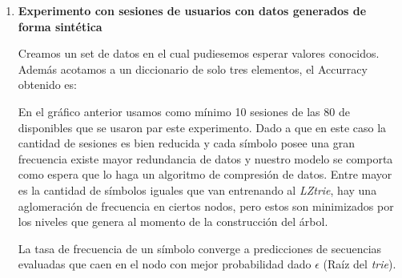 \vspace{1cm}
\begin{enumerate}
	\item \label{exp1} \textbf{Experimento con sesiones de usuarios con datos generados de forma sintética}
	
	
	Creamos un set de datos en el cual pudiesemos esperar valores conocidos. Además acotamos a un diccionario de solo tres elementos, el Accurracy obtenido es:
	
	
	
 
	
	En el gráfico anterior usamos como mínimo 10 sesiones de las 80 de disponibles que se usaron par este experimento. Dado a que en este caso la cantidad de sesiones es bien reducida y cada símbolo posee una gran frecuencia existe mayor redundancia de datos y nuestro modelo se comporta como espera que lo haga un algoritmo de compresión de datos. Entre mayor es la cantidad de símbolos iguales
	que van entrenando al \emph{LZtrie}, hay una aglomeración de frecuencia en ciertos nodos, pero estos son minimizados por los niveles que genera al momento de la construcción del árbol.
	
	La tasa de frecuencia de un símbolo converge a predicciones de secuencias evaluadas que caen en el nodo con mejor probabilidad dado $\epsilon$ (Raíz del \emph{trie}).
	


	\newcommand{\slice}[4]{
		\pgfmathparse{0.5*#1+0.5*#2}
		\let\midangle\pgfmathresult
		
		\draw[thick,fill=black!10] (0,0) -- (#1:1) arc (#1:#2:1) -- cycle;
		
		\node[label=\midangle:#4] at (\midangle:1) {};
		
		\pgfmathparse{min((#2-#1-10)/110*(-0.3),0)}
		\let\temp\pgfmathresult
		\pgfmathparse{max(\temp,-0.5) + 0.8}
		\let\innerpos\pgfmathresult
		\node at (\midangle:\innerpos) {#3};
	}
	

\end{enumerate}
